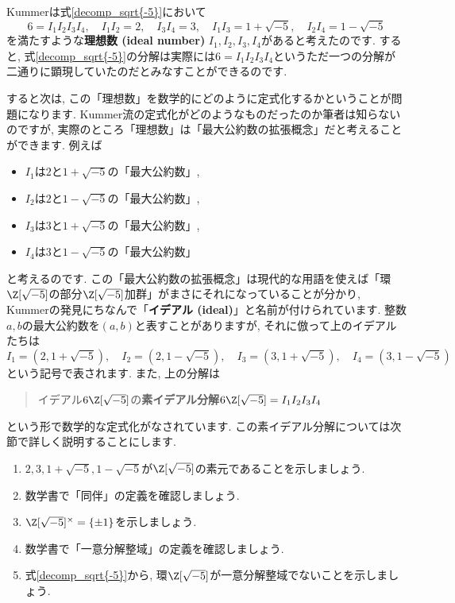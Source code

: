 \documentclass[11pt,b5paper,oneside,titlepage,lualatex]{ltjsreport}
\begin{document}
Kummerは式\eqref{decomp_sqrt{-5}}において
\[
6 = I_1 I_2 I_3 I_4, \quad
I_1 I_2 = 2, \quad
I_3 I_4 = 3, \quad
I_1 I_3 = 1 + \sqrt{-5}, \quad
I_2 I_4 = 1 - \sqrt{-5}
\]
を満たすような\textbf{理想数 (ideal number)} $ I_1, I_2, I_3, I_4 $があると考えたのです. 
すると, 式\eqref{decomp_sqrt{-5}}の分解は実際には$ 6 = I_1 I_2 I_3 I_4 $というただ一つの分解が二通りに顕現していたのだとみなすことができるのです. 

すると次は, この「理想数」を数学的にどのように定式化するかということが問題になります.
Kummer流の定式化がどのようなものだったのか筆者は知らないのですが, 実際のところ「理想数」は「最大公約数の拡張概念」だと考えることができます. 
例えば
\begin{itemize}
	\item $ I_1 $は$ 2 $と$ 1 + \sqrt{-5} $の「最大公約数」, 
	\item $ I_2 $は$ 2 $と$ 1 - \sqrt{-5} $の「最大公約数」, 
	\item $ I_3 $は$ 3 $と$ 1 + \sqrt{-5} $の「最大公約数」, 
	\item $ I_4 $は$ 3 $と$ 1 - \sqrt{-5} $の「最大公約数」
\end{itemize}
と考えるのです. 
この「最大公約数の拡張概念」は現代的な用語を使えば「環$ \Z[\sqrt{-5}] $の部分$ \Z[\sqrt{-5}] $加群」がまさにそれになっていることが分かり, Kummerの発見にちなんで「\textbf{イデアル (ideal)}」と名前が付けられています. 
整数$ a, b $の最大公約数を$ (a, b) $と表すことがありますが, それに倣って上のイデアルたちは
\[
I_1 = (2, 1 + \sqrt{-5} ), \quad
I_2 = (2, 1 - \sqrt{-5}), \quad
I_3 = (3, 1 + \sqrt{-5}), \quad
I_4 = (3, 1 - \sqrt{-5})
\]
という記号で表されます. 
また, 上の分解は
\begin{quote}
	\centering
	イデアル$ 6 \Z[\sqrt{-5}] $の\textbf{素イデアル分解}$ 6 \Z[\sqrt{-5}] = I_1 I_2 I_3 I_4 $
\end{quote}
という形で数学的な定式化がなされています. 
この素イデアル分解については次節で詳しく説明することにします. 

\begin{exc}{}{}
	\begin{enumerate}
		\item $ 2, 3, 1 + \sqrt{-5}, 1 - \sqrt{-5} $が$ \Z[\sqrt{-5}] $の素元であることを示しましょう. 
		\item 数学書で「同伴」の定義を確認しましょう. 
		\item $ \Z[\sqrt{-5}]^\times = \{ \pm 1 \} $を示しましょう. 
		\item 数学書で「一意分解整域」の定義を確認しましょう. 
		\item 式\eqref{decomp_sqrt{-5}}から, 環$ \Z[\sqrt{-5}] $が一意分解整域でないことを示しましょう. 
	\end{enumerate}
\end{exc}
\end{document}
